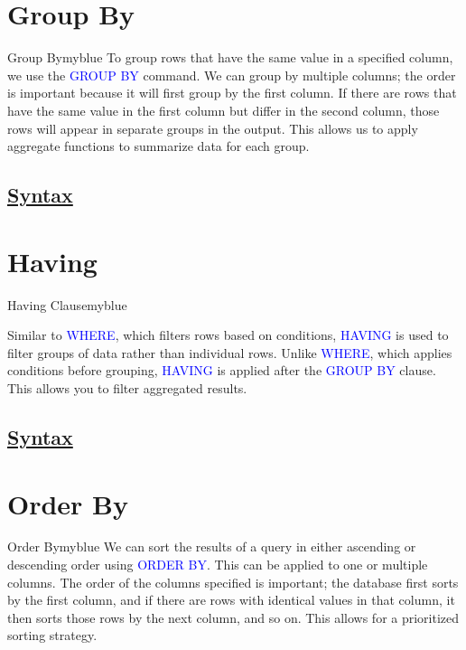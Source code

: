 \vspace{0.35cm}
\section{Group By} 
\begin{prettyBox}{Group By}{myblue}
To group rows that have the same value in a specified column, we use the \textcolor{blue}{GROUP BY} command.
We can group by multiple columns; the order is important because it will first group by the first column. If there
are rows that have the same value in the first column but differ in the second column, those rows will appear in
separate groups in the output. This allows us to apply aggregate functions to summarize data for each group.
\end{prettyBox}

\vspace{0.15cm}
\subsection*{\underline{Syntax}}



\vspace{0.35cm}
\section{Having}
\begin{prettyBox}{Having Clause}{myblue}

    Similar to \textcolor{blue}{WHERE}, which filters rows based on conditions, 
\textcolor{blue}{HAVING} is used to filter groups of data rather than individual rows. Unlike
\textcolor{blue}{WHERE}, which applies conditions before grouping, \textcolor{blue}{HAVING} is
applied after the \textcolor{blue}{GROUP BY} clause. This allows you to filter aggregated results.
\end{prettyBox}


\vspace{0.15cm}
\subsection*{\underline{Syntax}}



\vspace{0.35cm}
\section{Order By}
\begin{prettyBox}{Order By}{myblue}
We can sort the results of a query in either ascending or descending order using \textcolor{blue}{ORDER BY}. 
This can be applied to one or multiple columns. The order of the columns specified is important; the database
first sorts by the first column, and if there are rows with identical values in that column, it then sorts those
rows by the next column, and so on. This allows for a prioritized sorting strategy.
\end{prettyBox}

